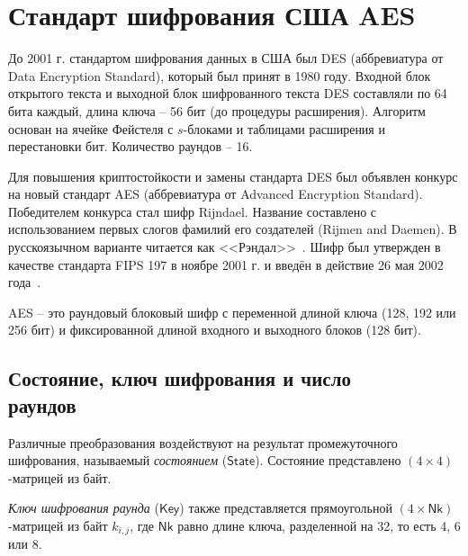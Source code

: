 \section{Стандарт шифрования США AES}

До 2001 г. стандартом шифрования данных в США был DES (аббревиатура от Data Encryption Standard), который был принят в 1980 году. Входной блок открытого текста и выходной блок шифрованного текста DES составляли по 64 бита каждый, длина ключа -- 56 бит (до процедуры расширения). Алгоритм основан на ячейке Фейстеля с $s$-блоками и таблицами расширения и перестановки бит. Количество раундов -- 16.

Для повышения криптостойкости и замены стандарта DES был объявлен конкурс на новый стандарт AES (аббревиатура от Advanced Encryption Standard). Победителем конкурса стал шифр Rijndael. Название составлено с использованием первых слогов фамилий его создателей (Rijmen and Daemen). В русскоязычном варианте читается как <<Рэндал>>~\cite{Kiwi:1999}. Шифр был утвержден в качестве стандарта FIPS 197 в ноябре 2001 г. и введён в действие 26 мая 2002 года~\cite{FIPS-PUB-197}.

AES -- это раундовый блоковый шифр с переменной длиной ключа (128, 192 или 256 бит) и фиксированной длиной входного и выходного блоков (128 бит).

\subsection[Состояние, ключ шифрования и число раундов]{Состояние, ключ шифрования и число \protect\\ раундов}

Различные преобразования воздействуют на результат промежуточного шифрования, называемый \textit{состоянием} ($\mathsf{State}$). Состояние представлено $(4 \times 4)$-матрицей из байт.

\textit{Ключ шифрования раунда} ($\mathsf{Key}$) также представляется прямоугольной $(4 \times \mathsf{Nk})$-матрицей из байт $k_{i,j}$, где $\mathsf{Nk}$ равно длине ключа, разделенной на 32, то есть 4, 6 или 8.

